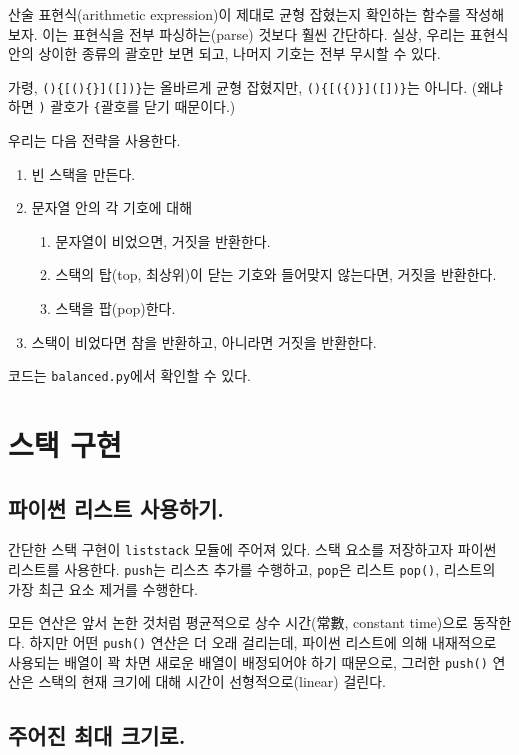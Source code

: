 \documentclass[a4paper, chapter]{oblivoir}
\begin{document}
산술 표현식(arithmetic expression)이 제대로 균형 잡혔는지 확인하는 함수를 작성해 보자. 이는 표현식을 전부 파싱하는(parse) 것보다 훨씬 간단하다. 실상, 우리는 표현식 안의 상이한 종류의 괄호만 보면 되고, 나머지 기호는 전부 무시할 수 있다.

가령, \texttt{()\{[()\{\}]([])\}}는 올바르게 균형 잡혔지만, \texttt{()\{[(\{)\}]([])\}}는 아니다. (왜냐하면 \texttt{)} 괄호가 \texttt{\{}괄호를 닫기 때문이다.)

우리는 다음 전략을 사용한다.

\begin{enumerate}
    \item 빈 스택을 만든다.
    \item 문자열 안의 각 기호에 대해 
        \begin{enumerate}[i]
            \item 문자열이 비었으면, 거짓을 반환한다.
            \item 스택의 탑(top, 최상위)이 닫는 기호와 들어맞지 않는다면, 거짓을 반환한다.
            \item 스택을 팝(pop)한다.
        \end{enumerate}
    \item 스택이 비었다면 참을 반환하고, 아니라면 거짓을 반환한다.
\end{enumerate}

코드는 \texttt{balanced.py}에서 확인할 수 있다.

\section*{스택 구현}

\subsection*{파이썬 리스트 사용하기.}

간단한 스택 구현이 \texttt{liststack} 모듈에 주어져 있다. 스택 요소를 저장하고자 파이썬 리스트를 사용한다. \texttt{push}는 리스츠 추가를 수행하고, \texttt{pop}은 리스트 \texttt{pop()}, 리스트의 가장 최근 요소 제거를 수행한다.

모든 연산은 앞서 논한 것처럼 평균적으로 상수 시간(常數, constant time)으로 동작한다. 하지만 어떤 \texttt{push()} 연산은 더 오래 걸리는데, 파이썬 리스트에 의해 내재적으로 사용되는 배열이 꽉 차면 새로운 배열이 배정되어야 하기 때문으로, 그러한 \texttt{push()} 연산은 스택의 현재 크기에 대해 시간이 선형적으로(linear) 걸린다.

\subsection*{주어진 최대 크기로.}
\end{document}
